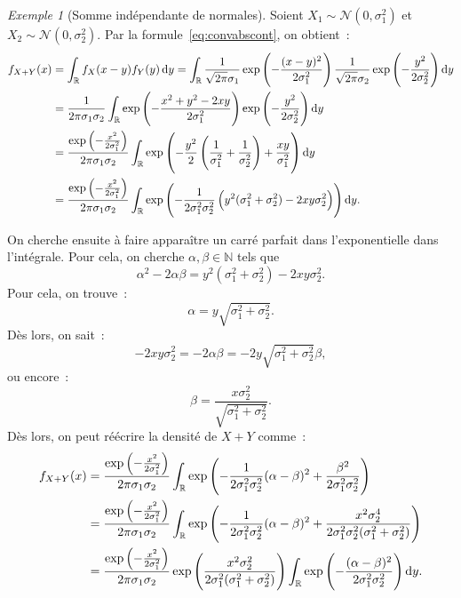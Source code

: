 \documentclass{article}
\newcommand{\N}{\mathbb N}
\newcommand{\R}{\mathbb R}
\theoremstyle{definition}
\theoremstyle{remark}
\newtheorem{ex}{Exemple}
\begin{document}
		\begin{ex}[Somme indépendante de normales] Soient $X_1 \sim \mathcal N(0, \sigma_1^2)$ et $X_2 \sim \mathcal N(0, \sigma_2^2)$. Par la
		formule~\eqref{eq:convabscont}, on obtient~:
		\begin{align*}
			f_{X+Y}(x) &= \int_\R f_X(x-y)f_Y(y)\dif y
			= \int_\R\frac 1{\sqrt{2\pi}\sigma_1}\exp\left(-\frac {(x-y)^2}{2\sigma_1^2}\right)\frac 1{\sqrt {2\pi}\sigma_2}\exp\left(-\frac {y^2}{2\sigma_2^2}\right)\dif y \\
			&= \frac 1{2\pi\sigma_1\sigma_2}\int_\R\exp\left(-\frac {x^2+y^2-2xy}{2\sigma_1^2}\right)\exp\left(-\frac {y^2}{2\sigma_2^2}\right)\dif y \\
			&= \frac {\exp\left(-\frac {x^2}{2\sigma_1^2}\right)}{2\pi\sigma_1\sigma_2}\int_\R\exp\left(-\frac {y^2}2\left(\frac 1{\sigma_1^2} + \frac 1{\sigma_2^2}\right)+ \frac {xy}{\sigma_1^2}\right)\dif y \\
			&= \frac {\exp\left(-\frac {x^2}{2\sigma_1^2}\right)}{2\pi\sigma_1\sigma_2}\int_\R\exp\left(-\frac 1{2\sigma_1^2\sigma_2^2}\left(y^2(\sigma_1^2 + \sigma_2^2) - 2xy\sigma_2^2\right)\right)\dif y.
		\end{align*}

		On cherche ensuite à faire apparaître un carré parfait dans l'exponentielle dans l'intégrale. Pour cela, on cherche $\alpha, \beta \in \N$ tels que
		\[\alpha^2 - 2\alpha\beta = y^2(\sigma_1^2 + \sigma_2^2) - 2xy\sigma_2^2.\]
		Pour cela, on trouve~:
		\[\alpha = y\sqrt{\sigma_1^2 + \sigma_2^2}.\]
		Dès lors, on sait~:
		\[-2xy\sigma_2^2 = -2\alpha\beta = -2y\sqrt{\sigma_1^2 + \sigma_2^2}\beta,\]
		ou encore~:
		\[\beta = \frac {x\sigma_2^2}{\sqrt{\sigma_1^2 + \sigma_2^2}}.\]
		Dès lors, on peut réécrire la densité de $X+Y$ comme~:
		\begin{align*}
			f_{X+Y}(x) &= \frac {\exp\left(-\frac {x^2}{2\sigma_1^2}\right)}{2\pi\sigma_1\sigma_2}\int_\R\exp\left(-\frac 1{2\sigma_1^2\sigma_2^2}(\alpha-\beta)^2 + \frac {\beta^2}{2\sigma_1^2\sigma_2^2}\right) \\
			           &= \frac {\exp\left(-\frac {x^2}{2\sigma_1^2}\right)}{2\pi\sigma_1\sigma_2}\int_\R\exp\left(-\frac 1{2\sigma_1^2\sigma_2^2}(\alpha-\beta)^2 + \frac {x^2\sigma_2^4}{2\sigma_1^2\sigma_2^2(\sigma_1^2 + \sigma_2^2)}\right) \\
			           &= \frac {\exp\left(-\frac {x^2}{2\sigma_1^2}\right)}{2\pi\sigma_1\sigma_2}\exp\left(\frac {x^2\sigma_2^2}{2\sigma_1^2(\sigma_1^2 + \sigma_2^2)}\right)\int_\R\exp\left(-\frac {(\alpha-\beta)^2}{2\sigma_1^2\sigma_2^2}\right)\dif y.
		\end{align*}


\end{ex}
\end{document}
